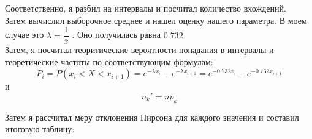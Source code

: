 \documentclass[a4paper,12pt, oneside]{book}
\begin{document}
Соответственно, я разбил на интервалы и посчитал количество вхождений.\\

Затем вычислил выборочное среднее и нашел оценку нашего параметра. В моем случае это $ \lambda = \dfrac{1}{\overline{x}} $ . Оно получилась равна $ 0.732 $\\

Затем, я посчитал теоритические вероятности попадания в интервалы и теоретические частоты по соответствующим  формулам:\\
$$ 
P_i = P(x_i < X < x_{i+1}) = e^{-\lambda x_i} - e^{-\lambda x_{i+1}} = e^{-0.732 x_i} - e^{-0.732 x_{i+1}}
$$
и
$$
n_k' = n p_k 
$$  


Затем я рассчитал меру отклонения Пирсона для каждого значения и составил итоговую таблицу:
\end{document}
